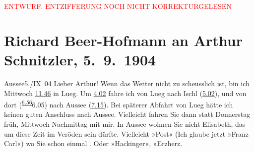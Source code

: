 
\begin{center}
            \textcolor{red}{ENTWURF. ENTZIFFERUNG NOCH NICHT KORREKTURGELESEN}
                      \end{center}
            
               \section[Richard Beer-Hofmann an Arthur Schnitzler, 5. 9. 1904]{ Richard Beer-Hofmann an Arthur Schnitzler, 5. 9. 1904}\nopagebreak{}\rehead{ }\begin{ledgroupsized}[t]{13cm}\normalsize\beginnumbering{} \toendnotes[C]{\smallbreak\pagebreak[2]} 
\toendnotes[C]{\smallbreak}\pstart
           \noindent{}\centering{}{\pb}Aussee5./IX 04\pend
           \pstart
           \noindent{}Lieber Arthur! Wenn das Wetter nicht zu scheusslich ist, bin ich
                  Mittwoch{ }\uline{11.46} in Lueg. Um \uline{4.02} fahre ich von Lueg nach Ischl (\uline{5.02}), und von dort (\substVorne{}\textsuperscript{\uline{6.56}}\substDazwischen{}6.05\substHinten{}) nach Aussee (\uline{7.15}). Bei späterer Abfahrt von Lueg hätte ich
               keinen guten Anschluss nach Aussee. Vielleicht
               fahren Sie dann  statt Donnerstag früh,
                  Mittwoch Nachmittag mit mir. In Aussee wohnen Sie nicht Elisabeth, das um
               diese Zeit im Veröden sein dürfte. Vielleicht »Post« (Ich glaube jetzt »Franz Carl«) wo
               Sie schon einmal \label{K_L01436_1v}\label{K_L01436_1h}. Oder »Hackinger«, »Erzherz.

\end{ledgroupsized}

